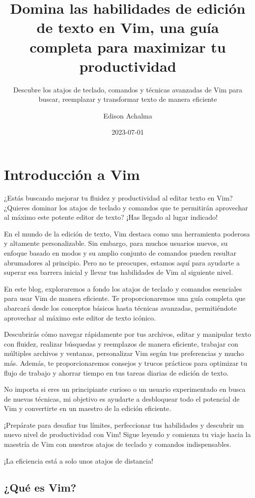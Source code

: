 \documentclass[
  a4paper,
]{article}
\title{Domina las habilidades de edición de texto en Vim, una guía
completa para maximizar tu productividad}
\subtitle{Descubre los atajos de teclado, comandos y técnicas avanzadas
de Vim para buscar, reemplazar y transformar texto de manera eficiente}
\author{Edison Achalma}
\date{2023-07-01}
\begin{document}
\maketitle

\section{Introducción a Vim}\label{introducciuxf3n-a-vim}

¿Estás buscando mejorar tu fluidez y productividad al editar texto en
Vim? ¿Quieres dominar los atajos de teclado y comandos que te permitirán
aprovechar al máximo este potente editor de texto? ¡Has llegado al lugar
indicado!

En el mundo de la edición de texto, Vim destaca como una herramienta
poderosa y altamente personalizable. Sin embargo, para muchos usuarios
nuevos, su enfoque basado en modos y su amplio conjunto de comandos
pueden resultar abrumadores al principio. Pero no te preocupes, estamos
aquí para ayudarte a superar esa barrera inicial y llevar tus
habilidades de Vim al siguiente nivel.

En este blog, exploraremos a fondo los atajos de teclado y comandos
esenciales para usar Vim de manera eficiente. Te proporcionaremos una
guía completa que abarcará desde los conceptos básicos hasta técnicas
avanzadas, permitiéndote aprovechar al máximo este editor de texto
icónico.

Descubrirás cómo navegar rápidamente por tus archivos, editar y
manipular texto con fluidez, realizar búsquedas y reemplazos de manera
eficiente, trabajar con múltiples archivos y ventanas, personalizar Vim
según tus preferencias y mucho más. Además, te proporcionaremos consejos
y trucos prácticos para optimizar tu flujo de trabajo y ahorrar tiempo
en tus tareas diarias de edición de texto.

No importa si eres un principiante curioso o un usuario experimentado en
busca de nuevas técnicas, mi objetivo es ayudarte a desbloquear todo el
potencial de Vim y convertirte en un maestro de la edición eficiente.

¡Prepárate para desafiar tus límites, perfeccionar tus habilidades y
descubrir un nuevo nivel de productividad con Vim! Sigue leyendo y
comienza tu viaje hacia la maestría de Vim con nuestros atajos de
teclado y comandos indispensables.

¡La eficiencia está a solo unos atajos de distancia!

\subsection{¿Qué es Vim?}\label{quuxe9-es-vim}
\end{document}
